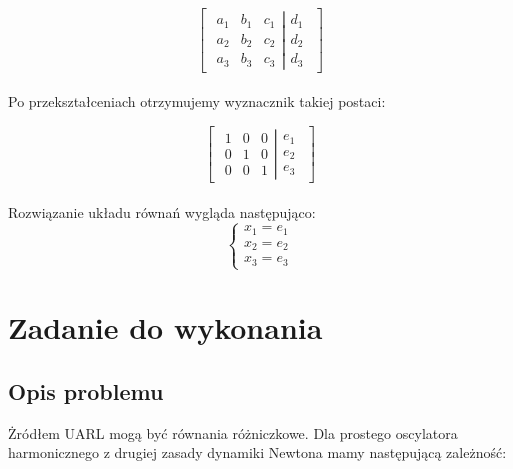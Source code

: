 \documentclass{article}
\begin{document}
\begin{equation}
\begin{bmatrix}
	\left.\begin{matrix}
	a_1 & b_1 & c_1 \\
	a_2 & b_2 & c_2 \\
	a_3 & b_3 & c_3
	\end{matrix}
	\right| \begin{matrix}
	d_1 \\
	d_2 \\
	d_3
	\end{matrix}
\end{bmatrix}
\end{equation}
\\
Po przekształceniach otrzymujemy wyznacznik takiej postaci:

\begin{equation}
\begin{bmatrix}
	\left.\begin{matrix}
	1 & 0 & 0 \\
	0 & 1 & 0 \\
	0& 0 & 1
	\end{matrix}
	\right| \begin{matrix}
	e_1 \\
	e_2 \\
	e_3
	\end{matrix}
\end{bmatrix}
\end{equation}
\\
Rozwiązanie układu równań wygląda następująco:
\begin{equation}
\begin{cases}
	x_1=e_1 \\
	x_2=e_2 \\
	x_3=e_3
\end{cases}
\end{equation}


	
\section{Zadanie do wykonania}

\subsection{Opis problemu}
\par
Żródłem UARL mogą być równania różniczkowe. Dla prostego oscylatora harmonicznego z drugiej zasady dynamiki Newtona mamy następującą zależność:
\end{document}
